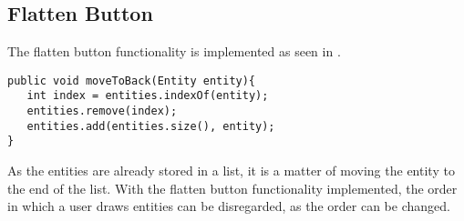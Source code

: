 \subsection{Flatten Button}
The flatten button functionality is implemented as seen in .

\begin{lstlisting}[label={lst:flatten}, caption={Flatten Button functionality.}]
public void moveToBack(Entity entity){
   int index = entities.indexOf(entity);
   entities.remove(index);
   entities.add(entities.size(), entity);
}
\end{lstlisting}

As the entities are already stored in a list, it is a matter of moving the entity to the end of the list.
With the flatten button functionality implemented, the order in which a user draws entities can be disregarded, as the order can be changed.